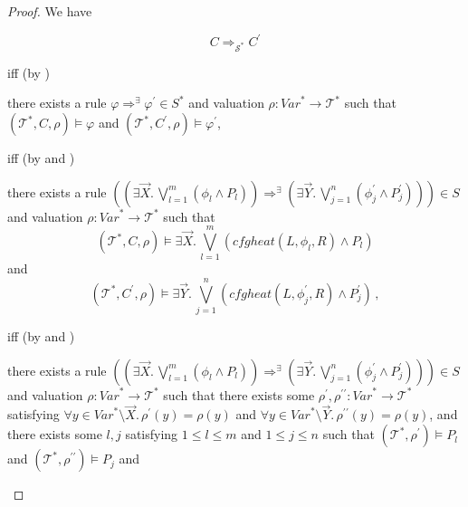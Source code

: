 \documentclass{article}
\newenvironment{proofenv}
  {
    \VerbatimEnvironment\begin{tcolorbox}[colback=black!0!white] %
  }
  {
   \end{tcolorbox}
  }
\begin{document}
\begin{proof}
We have
\begin{proofenv}
    \begin{equation*}
        C \Rightarrow_{\mathcal{S}^*} C^\prime
    \end{equation*}
\end{proofenv}
iff (by )
\begin{proofenv}
    there exists a rule $\varphi \Rightarrow^\exists \varphi^\prime \in S^*$
    and valuation $\rho : \mathit{Var}^* \to \mathcal{T}^*$ such that
    $(\mathcal{T}^*, C, \rho) \vDash \varphi$
    and $(\mathcal{T}^*, C^\prime, \rho) \vDash \varphi^\prime$,
\end{proofenv}
iff (by
 and )
\begin{proofenv}
    there exists a rule $((\exists \vec{X}.\, \bigvee_{l=1}^{m} (\phi_l \land P_l)) \Rightarrow^\exists (\exists \vec{Y}.\, \bigvee_{j=1}^{n} (\phi^\prime_j \land P^\prime_j))) \in S$
    and valuation $\rho : \mathit{Var}^* \to \mathcal{T}^*$ such that
    \begin{equation*}
    (\mathcal{T}^*, C, \rho) \vDash \exists \vec{X}.\, \bigvee_{l=1}^{m}(\mathit{cfgheat}(L, \phi_l, R) \land P_l)
    \end{equation*}
    and
    \begin{equation*}
        (\mathcal{T}^*, C^\prime, \rho) \vDash
        \exists \vec{Y}.\, \bigvee_{j=1}^{n}(\mathit{cfgheat}(L, \phi^\prime_j, R) \land P^\prime_j) \, ,
    \end{equation*}
\end{proofenv}
iff (by  and )
\begin{proofenv}
    there exists a rule $((\exists \vec{X}.\, \bigvee_{l=1}^{m} (\phi_l \land P_l)) \Rightarrow^\exists (\exists \vec{Y}.\, \bigvee_{j=1}^{n} (\phi^\prime_j \land P^\prime_j))) \in S$
    and valuation $\rho : \mathit{Var}^* \to \mathcal{T}^*$ such that
    there exists some $\rho^\prime,\rho^{\prime\prime} : \mathit{Var}^* \to \mathcal{T}^*$
    satisfying $\forall y \in \mathit{Var}^* \setminus \vec{X}.\, \rho^\prime(y) = \rho(y)$
    and $\forall y \in \mathit{Var}^* \setminus \vec{Y}.\, \rho^{\prime\prime}(y) = \rho(y)$,
    and there exists some $l,j$ satisfying $1 \leq l \leq m$ and $1 \leq j \leq n$ such that
    $(\mathcal{T}^*, \rho^\prime) \vDash P_l$ and $(\mathcal{T}^*, \rho^{\prime\prime}) \vDash P_j$ and
    \begin{equation*}

\end{equation*}
\end{proofenv}
\end{proof}
\end{document}
